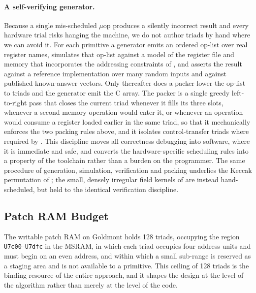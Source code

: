 \paragraph{A self-verifying generator.}
Because a single mis-scheduled $\mu$op produces a silently incorrect result and
every hardware trial risks hanging the machine, we do not author triads by hand
where we can avoid it. For each primitive a generator emits an ordered op-list
over real register names, simulates that op-list against a model of the register
file and memory that incorporates the addressing constraints of
, and asserts the result against a reference implementation
over many random inputs and against published known-answer vectors. Only
thereafter does a packer lower the op-list to triads and the generator emit the
C array. The packer is a single greedy left-to-right pass that closes the
current triad whenever it fills its three slots, whenever a second memory
operation would enter it, or whenever an operation would consume a register
loaded earlier in the same triad, so that it mechanically enforces the two
packing rules above, and it isolates control-transfer triads where required by
. This discipline moves all correctness debugging into
software, where it is immediate and safe, and converts the hardware-specific
scheduling rules into a property of the toolchain rather than a burden on the
programmer. The same procedure of generation, simulation, verification and
packing underlies the Keccak permutation of ; the small,
densely irregular field kernels of  are instead
hand-scheduled, but held to the identical verification discipline.

\subsection{Patch RAM Budget}
\label{sec:budget}

The writable patch RAM on Goldmont holds 128 triads, occupying the region
\texttt{U7c00}--\texttt{U7dfc} in the MSRAM, in which each triad occupies four
address units and must begin on an even address, and within which a small
sub-range is reserved as a staging area and is not available to a primitive.
This ceiling of 128 triads is the binding resource of the entire approach, and
it shapes the design at the level of the algorithm rather than merely at the
level of the code.

